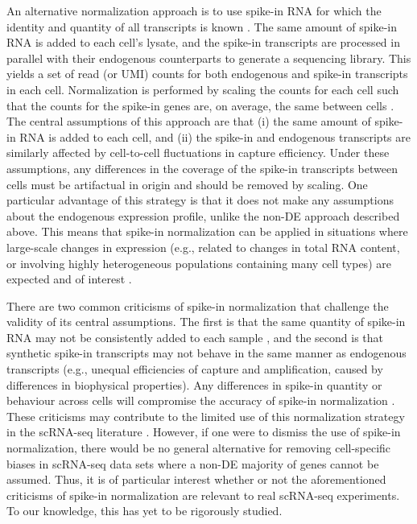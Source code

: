 \documentclass{article}
\begin{document}
An alternative normalization approach is to use spike-in RNA for which the identity and quantity of all transcripts is known \cite{stegle2015computational,bacher2016design}.
The same amount of spike-in RNA is added to each cell's lysate, and the spike-in transcripts are processed in parallel with their endogenous counterparts to generate a sequencing library.
This yields a set of read (or UMI) counts for both endogenous and spike-in transcripts in each cell.
Normalization is performed by scaling the counts for each cell such that the counts for the spike-in genes are, on average, the same between cells \cite{katayama2013samstrt}.
The central assumptions of this approach are that (i) the same amount of spike-in RNA is added to each cell, and (ii) the spike-in and endogenous transcripts are similarly affected by cell-to-cell fluctuations in capture efficiency.
Under these assumptions, any differences in the coverage of the spike-in transcripts between cells must be artifactual in origin and should be removed by scaling.
One particular advantage of this strategy is that it does not make any assumptions about the endogenous expression profile, unlike the non-DE approach described above.
This means that spike-in normalization can be applied in situations where large-scale changes in expression (e.g., related to changes in total RNA content, or involving highly heterogeneous populations containing many cell types) are expected and of interest \cite{lun2016stepbystep,nestorowa2016single}.

There are two common criticisms of spike-in normalization that challenge the validity of its central assumptions.
The first is that the same quantity of spike-in RNA may not be consistently added to each sample \cite{robinson2010tmm}, and the second is that synthetic spike-in transcripts may not behave in the same manner as endogenous transcripts \cite{grun2015design} (e.g., unequal efficiencies of capture and amplification, caused by differences in biophysical properties).
Any differences in spike-in quantity or behaviour across cells will compromise the accuracy of spike-in normalization \cite{risso2014normalization}.
These criticisms may contribute to the limited use of this normalization strategy in the scRNA-seq literature \cite{bacher2016design}.
However, if one were to dismiss the use of spike-in normalization, there would be no general alternative for removing cell-specific biases in scRNA-seq data sets where a non-DE majority of genes cannot be assumed.
Thus, it is of particular interest whether or not the aforementioned criticisms of spike-in normalization are relevant to real scRNA-seq experiments.
To our knowledge, this has yet to be rigorously studied.
\end{document}
